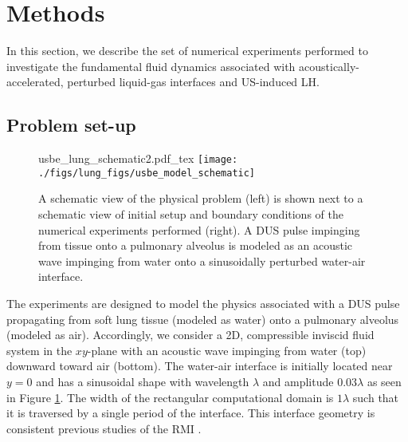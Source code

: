 \section{Methods} \label{sec:usbe_lung_methods}%
In this section, we describe the set of numerical experiments
performed to investigate the fundamental fluid dynamics associated
with acoustically-accelerated, perturbed liquid-gas interfaces and
\ac{US}-induced \ac{LH}.

\subsection{Problem set-up}
\label{subsec:setup}
\begin{figure}[t]
  \centering

  \def\svgwidth{0.48\textwidth}
  {usbe_lung_schematic2.pdf_tex} \hfill%
  \texttt{[image: ./figs/lung\_figs/usbe\_model\_schematic]} \hfill
  \caption[A schematic view of lung \ac{DUS} and the model problem]{A schematic view of the physical problem (left) is shown next
    to a schematic view of initial setup and boundary conditions of the
    numerical experiments performed (right). A \ac{DUS} pulse impinging
    from tissue onto a pulmonary alveolus is modeled as an acoustic wave
    impinging from water onto a sinusoidally perturbed water-air interface.}
  \label{fig:lung_schematic}
\end{figure}
The experiments are designed to model the physics associated with a
\ac{DUS} pulse propagating from soft lung tissue (modeled as water)
onto a pulmonary alveolus (modeled as air). Accordingly, we consider a
2D, compressible inviscid fluid system in the $xy$-plane with an
acoustic wave impinging from water (top) downward toward air
(bottom). The water-air interface is initially located near $y=0$ 
and has a sinusoidal shape with wavelength $\lambda$ and amplitude
$0.03\lambda$ as seen in Figure \ref{fig:lung_schematic}. The width
of the rectangular computational domain is $1\lambda$ such that it is
traversed by a single period of the interface. This interface geometry
is consistent previous studies of the \ac{RMI}
\citep{Brouillette2002}.








